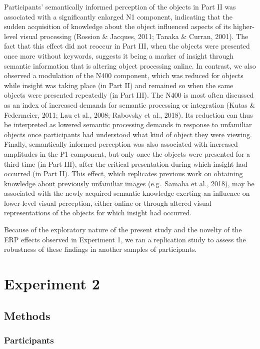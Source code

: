 \documentclass[
  english,
  man,11pt,floatsintext]{apa7}
\begin{document}
Participants' semantically informed perception of the objects in Part II was associated with a significantly enlarged N1 component, indicating that the sudden acquisition of knowledge about the object influenced aspects of its higher-level visual processing (Rossion \& Jacques, 2011; Tanaka \& Curran, 2001). The fact that this effect did not reoccur in Part III, when the objects were presented once more without keywords, suggests it being a marker of insight through semantic information that is altering object processing online. In contrast, we also observed a modulation of the N400 component, which was reduced for objects while insight was taking place (in Part II) and remained so when the same objects were presented repeatedly (in Part III). The N400 is most often discussed as an index of increased demands for semantic processing or integration (Kutas \& Federmeier, 2011; Lau et al., 2008; Rabovsky et al., 2018). Its reduction can thus be interpreted as lowered semantic processing demands in response to unfamiliar objects once participants had understood what kind of object they were viewing. Finally, semantically informed perception was also associated with increased amplitudes in the P1 component, but only once the objects were presented for a third time (in Part III), after the critical presentation during which insight had occurred (in Part II). This effect, which replicates previous work on obtaining knowledge about previously unfamiliar images (e.g.~Samaha et al., 2018), may be associated with the newly acquired semantic knowledge exerting an influence on lower-level visual perception, either online or through altered visual representations of the objects for which insight had occurred.

Because of the exploratory nature of the present study and the novelty of the ERP effects observed in Experiment 1, we ran a replication study to assess the robustness of these findings in another samples of participants.

\hypertarget{experiment-2}{%
\section{Experiment 2}\label{experiment-2}}

\hypertarget{methods-1}{%
\subsection{Methods}\label{methods-1}}

\hypertarget{participants-1}{%
\subsubsection{Participants}\label{participants-1}}
\end{document}

